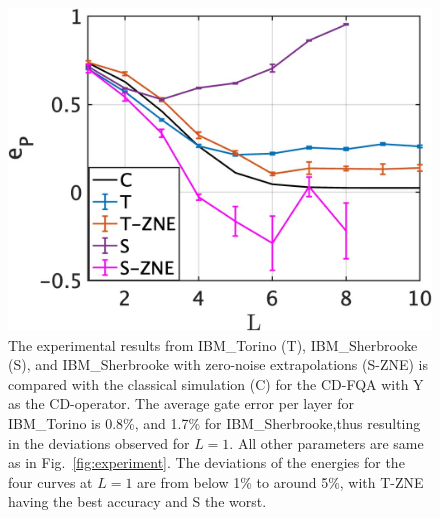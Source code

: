 \documentclass[twocolumn,aps,superscriptaddress,floatfix,longbibliography]{revtex4-2}
\begin{document}
\begin{figure}[h!]
    \centering
    \includegraphics[scale=0.2]{experiment-1.jpg}
\caption{
   The experimental results from IBM\_Torino (T), IBM\_Sherbrooke (S), and IBM\_Sherbrooke with zero-noise extrapolations (S-ZNE) is compared with the classical simulation (C) for the CD-FQA with Y as the CD-operator. The average gate error per layer for IBM\_Torino is 0.8\%, and 1.7\% for IBM\_Sherbrooke,thus resulting in the deviations observed for $L=1$.
   All other parameters are same as in Fig.~\ref{fig:experiment}. The deviations of the energies for the four curves at $L=1$ are from below 1\% to around 5\%, with T-ZNE having the best accuracy and S the worst.}
   

\end{figure}
\end{document}
